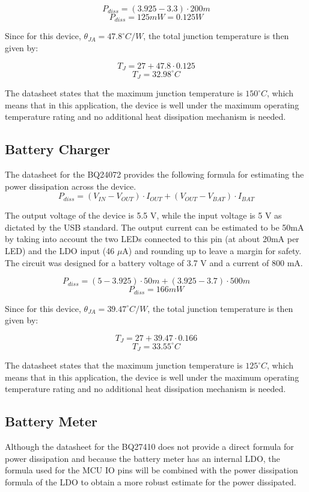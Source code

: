 \[P_{diss} = \left(3.925 - 3.3\right)\cdot 200m\]
\[\boxed{P_{diss} = 125mW = 0.125W}\]

Since for this device, $\theta_{JA} = 47.8^\circ C/W$, the total junction temperature is then given by:

\[T_J = 27 + 47.8 \cdot 0.125 \]
\[\boxed{T_J = 32.98 ^\circ C}\]

The datasheet states that the maximum junction temperature is $150^\circ C$, which means that in this application, the device is well under the maximum operating temperature rating and no additional heat dissipation mechanism is needed.


\subsection{Battery Charger}

The datasheet for the BQ24072 provides the following formula for estimating the power dissipation across the device.
\[P_{diss} = \left(V_{IN} - V_{OUT}\right)\cdot I_{OUT} + \left(V_{OUT} - V_{BAT}\right)\cdot I_{BAT}\]

The output voltage of the device is 5.5 V, while the input voltage is 5 V as dictated by the USB standard.  The output current can be estimated to be 50mA by taking into account the two LEDs connected to this pin (at about 20mA per LED) and the LDO input (46 $\mu$A) and rounding up to leave a margin for safety.  The circuit was designed for a battery voltage of 3.7 V and a current of 800 mA.

\[P_{diss} = \left(5 - 3.925\right)\cdot 50m + \left(3.925 - 3.7\right)\cdot 500m\]
\[\boxed{P_{diss} = 166 mW}\]

Since for this device, $\theta_{JA} = 39.47^\circ C/W$, the total junction temperature is then given by:

\[T_J = 27 + 39.47 \cdot 0.166 \]
\[\boxed{T_J = 33.55 ^\circ C}\]

The datasheet states that the maximum junction temperature is $125^\circ C$, which means that in this application, the device is well under the maximum operating temperature rating and no additional heat dissipation mechanism is needed.


\subsection{Battery Meter}
Although the datasheet for the BQ27410 does not provide a direct formula for power dissipation and because the battery meter has an internal LDO, the formula used for the MCU IO pins will be combined with the power dissipation formula of the LDO to obtain a more robust estimate for the power dissipated.  

